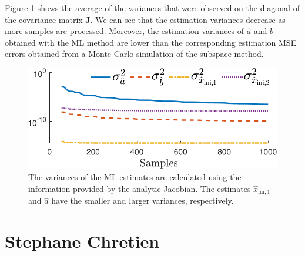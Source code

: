 \documentclass[11pt]{article}
\begin{document}
\begin{itemize}
    Figure \ref{fig:cov_lo_40dB_s1} shows \color{blue} the average \color{black} of the variances that were observed on the diagonal of the covariance matrix $\mathbf{J}$. 
    We can see that the estimation variances decrease as more samples are processed.
    Moreover, the estimation variances of $\widehat{a}$ and $\widehat{b}$ obtained with the ML method are lower than the corresponding estimation MSE errors obtained from a Monte Carlo simulation of the subspace method.

    \renewcommand{\thefigure}{6.9}
    \begin{figure}[!htbp]
    \centering
    \includegraphics[width=0.6\columnwidth]{../ChapterRampInput/fig/Fig_8.pdf} 
    \caption{ \label{fig:cov_lo_40dB_s1} The variances of the ML estimates are calculated using the information provided by the analytic Jacobian. \color{blue} The estimates $\widehat{x}_{\mathrm{ini,1}}$ and $\widehat{a}$ have the smaller and larger variances, respectively. \color{black}  }
    \end{figure}

    \color{black} 

\end{itemize}

\section*{Stephane Chretien}
\end{document}
